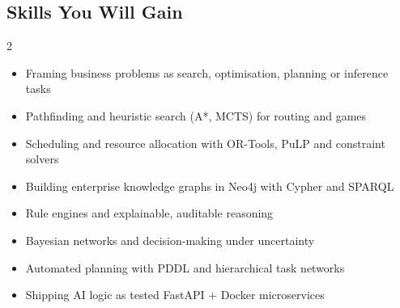 \documentclass[10pt,a4paper]{article}
\begin{document}
\subsection*{Skills You Will Gain}\begin{multicols}{2}\begin{itemize}\small
\item Framing business problems as search, optimisation, planning or inference tasks
\item Pathfinding and heuristic search (A*, MCTS) for routing and games
\item Scheduling and resource allocation with OR-Tools, PuLP and constraint solvers
\item Building enterprise knowledge graphs in Neo4j with Cypher and SPARQL
\item Rule engines and explainable, auditable reasoning
\item Bayesian networks and decision-making under uncertainty
\item Automated planning with PDDL and hierarchical task networks
\item Shipping AI logic as tested FastAPI + Docker microservices
\end{itemize}\end{multicols}
\end{document}
